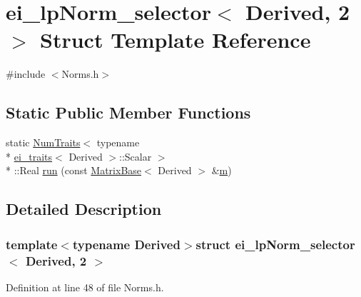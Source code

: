 \hypertarget{structei__lp_norm__selector_3_01_derived_00_012_01_4}{\section{ei\-\_\-lp\-Norm\-\_\-selector$<$ Derived, 2 $>$ Struct Template Reference}
\label{structei__lp_norm__selector_3_01_derived_00_012_01_4}
}


{\ttfamily \#include $<$Norms.\-h$>$}

\subsection*{Static Public Member Functions}
\begin{DoxyCompactItemize}
\item 
static \hyperlink{struct_num_traits}{Num\-Traits}$<$ typename \\*
\hyperlink{structei__traits}{ei\-\_\-traits}$<$ Derived $>$\-::Scalar $>$\\*
\-::Real \hyperlink{structei__lp_norm__selector_3_01_derived_00_012_01_4_acac27bbfba873e4600121f39e87189d6}{run} (const \hyperlink{class_matrix_base}{Matrix\-Base}$<$ Derived $>$ \&\hyperlink{glext_8h_af593500c283bf1a787a6f947f503a5c2}{m})
\end{DoxyCompactItemize}


\subsection{Detailed Description}
\subsubsection*{template$<$typename Derived$>$struct ei\-\_\-lp\-Norm\-\_\-selector$<$ Derived, 2 $>$}



Definition at line 48 of file Norms.\-h.




